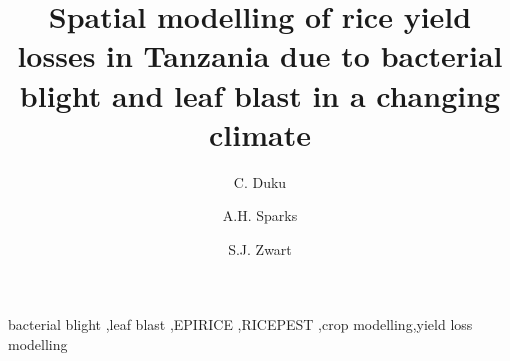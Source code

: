 \documentclass[preprint,12pt]{elsarticle}
\begin{document}
\begin{frontmatter}



\title{Spatial modelling of rice yield losses in Tanzania due to bacterial blight and leaf blast in a changing climate} 


\author[AfricaRice]{C. Duku}
\author[IRRI]{A.H. Sparks}
\author[AfricaRice]{S.J. Zwart}


\address[AfricaRice]{Africa Rice Center (AfricaRice), 01 BP 2031, Cotonou, BENIN}
\address[IRRI]{International Rice Research Institute (IRRI), DAPO Box 7777, Metro Manila, 1301, PHILIPPINES}

\begin{abstract}

\end{abstract}

\begin{keyword}
bacterial blight \sep leaf blast \sep EPIRICE \sep RICEPEST \sep crop modelling\sep yield loss modelling
\end{keyword}

\end{frontmatter}



\linenumbers
\end{document}
